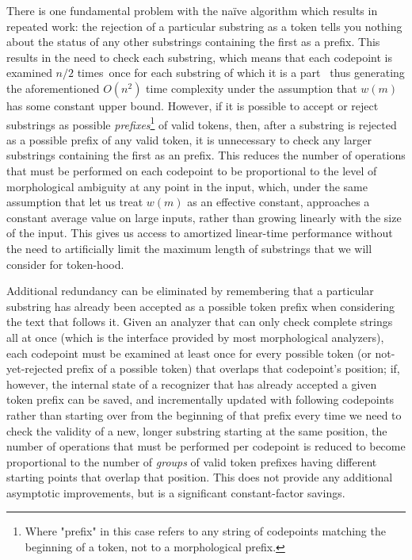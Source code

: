 There is one fundamental problem with the naïve algorithm which results in repeated work: the rejection of a particular substring as a token tells you nothing about the status of any other substrings containing the first as a prefix. This results in the need to check each substring, which means that each codepoint is examined $n/2$ times\textemdash~once for each substring of which it is a part\textemdash~ thus generating the aforementioned $O(n^{2})$ time complexity under the assumption that $w(m)$ has some constant upper bound. However, if it is possible to accept or reject substrings as possible \textit{prefixes}\footnote{Where "prefix" in this case refers to any string of codepoints matching the beginning of a token, not to a morphological prefix.} of valid tokens, then, after a substring is rejected as a possible prefix of any valid token, it is unnecessary to check any larger substrings containing the first as an prefix. This reduces the number of operations that must be performed on each codepoint to be proportional to the level of morphological ambiguity at any point in the input, which, under the same assumption that let us treat $w(m)$ as an effective constant, approaches a constant average value on large inputs, rather than growing linearly with the size of the input. This gives us access to amortized linear-time performance without the need to artificially limit the maximum length of substrings that we will consider for token-hood.

Additional redundancy can be eliminated by remembering that a particular substring has already been accepted as a possible token prefix when considering the text that follows it. Given an analyzer that can only check complete strings all at once (which is the interface provided by most morphological analyzers), each codepoint must be examined at least once for every possible token (or not-yet-rejected prefix of a possible token) that overlaps that codepoint's position; if, however, the internal state of a recognizer that has already accepted a given token prefix can be saved, and incrementally updated with following codepoints rather than starting over from the beginning of that prefix every time we need to check the validity of a new, longer substring starting at the same position, the number of operations that must be performed per codepoint is reduced to become proportional to the number of \textit{groups} of valid token prefixes having different starting points that overlap that position. This does not provide any additional asymptotic improvements, but is a significant constant-factor savings.

